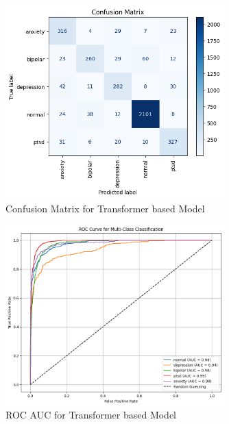 \begin{figure}[h!]  
    \centering
    \includegraphics[width=0.75\textwidth]{Images/T CM.png}  
    \caption{Confusion Matrix for Transformer based Model}
    \label{dfdl145}  %
\end{figure}

\begin{figure}[h!]  
    \centering
    \includegraphics[width=0.75\textwidth]{Images/T ROC.png}  
    \caption{ROC AUC for Transformer based Model}
    \label{dfdl145}  %
\end{figure}


